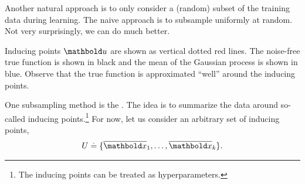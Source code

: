 Another natural approach is to only consider a (random) subset of the training data during learning.
The naive approach is to subsample uniformly at random.
Not very surprisingly, we can do much better.

\begin{marginfigure}
  \caption{Inducing points $\vu$ are shown as vertical dotted red lines.
  The noise-free true function is shown in black and the mean of the Gaussian process is shown in blue.
  Observe that the true function is approximated ``well'' around the inducing points.}
\end{marginfigure}

One subsampling method is the  \citep{ip}.
The idea is to summarize the data around so-called inducing points.\footnote{The inducing points can be treated as hyperparameters.}
For now, let us consider an arbitrary set of inducing points, \begin{align*}
  \sU \defeq \{\overline{\vx}_1, \dots, \overline{\vx}_k\}.
\end{align*}

